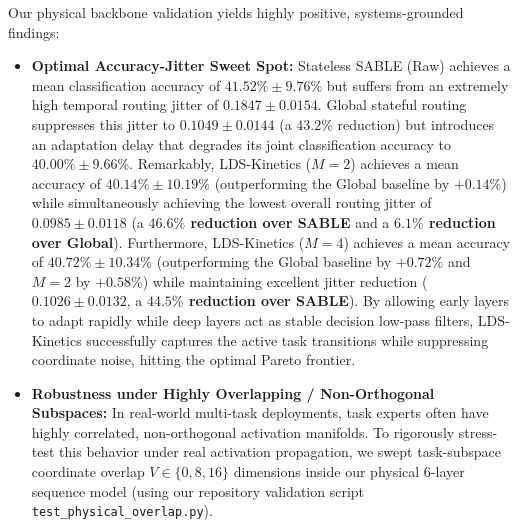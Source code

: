 Our physical backbone validation yields highly positive, systems-grounded findings:
\begin{itemize}
    \item \textbf{Optimal Accuracy-Jitter Sweet Spot:} Stateless SABLE (Raw) achieves a mean classification accuracy of $41.52\% \pm 9.76\%$ but suffers from an extremely high temporal routing jitter of $0.1847 \pm 0.0154$. Global stateful routing suppresses this jitter to $0.1049 \pm 0.0144$ (a $43.2\%$ reduction) but introduces an adaptation delay that degrades its joint classification accuracy to $40.00\% \pm 9.66\%$. Remarkably, LDS-Kinetics ($M=2$) achieves a mean accuracy of $40.14\% \pm 10.19\%$ (outperforming the Global baseline by $+0.14\%$) while simultaneously achieving the lowest overall routing jitter of $0.0985 \pm 0.0118$ (a \textbf{$46.6\%$ reduction over SABLE} and a \textbf{$6.1\%$ reduction over Global}). Furthermore, LDS-Kinetics ($M=4$) achieves a mean accuracy of $40.72\% \pm 10.34\%$ (outperforming the Global baseline by $+0.72\%$ and $M=2$ by $+0.58\%$) while maintaining excellent jitter reduction ($0.1026 \pm 0.0132$, a \textbf{$44.5\%$ reduction over SABLE}). By allowing early layers to adapt rapidly while deep layers act as stable decision low-pass filters, LDS-Kinetics successfully captures the active task transitions while suppressing coordinate noise, hitting the optimal Pareto frontier.
    \item \textbf{Robustness under Highly Overlapping / Non-Orthogonal Subspaces:} In real-world multi-task deployments, task experts often have highly correlated, non-orthogonal activation manifolds. To rigorously stress-test this behavior under real activation propagation, we swept task-subspace coordinate overlap $V \in \{0, 8, 16\}$ dimensions inside our physical 6-layer sequence model (using our repository validation script \texttt{test\_physical\_overlap.py}). 
    

\end{itemize}
